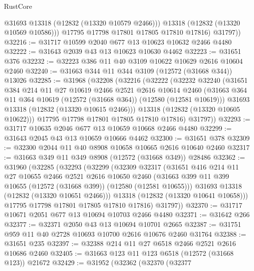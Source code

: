 \begin{lexlean}{RustCore}
\begin{coremodule}
              @31693
              @13318
              (@12832 (@13320 @10579 @2466)))
            @13318
            (@12832 (@13320 @10569 @10586)))
          @17795
          @17798
          @17801
          @17805
          @17810
          @17816)
        @31797))
@32216 := @31717 @10599 @2040 @677 @13 @10623 @10632 @2466 @4480
@32222 := @31643 @2039 @43 @13 @10623 @10630 @4462
@32223 := @31651 @376
@32232 := @32223 @386 @11 @40 @3109 @10622 @10629 @2616 @10604 @2460
@32240 := @31663 @344 @11 @344 @3109 (@12572 (@31668 @344)) @13026
@32285 := @31968
    (@32208
      (@32216
        (@32222
          (@32232
            @32240
            (@31651
              @384
              @214
              @11
              @27
              @10619
              @2466
              @2521
              @2616
              @10614
              @2460
              (@31663 @364 @11 @364 @10619 (@12572 (@31668 @364)) (@12580 (@12581 @10619)))
              @31693
              @13318
              (@12832 (@13320 @10615 @2466)))
            @13318
            (@12832 (@13320 @10605 @10622)))
          @17795
          @17798
          @17801
          @17805
          @17810
          @17816)
        @31797))
@32293 := @31717 @10635 @2046 @677 @13 @10659 @10668 @2466 @4480
@32299 := @31643 @2045 @43 @13 @10659 @10666 @4462
@32300 := @31651 @378
@32309 := @32300 @2044 @11 @40 @8908 @10658 @10665 @2616 @10640 @2460
@32317 := @31663 @349 @11 @349 @8908 (@12572 (@31668 @349)) @28486
@32362 := @31960
    (@32285
      (@32293
        (@32299
          (@32309
            @32317
            (@31651
              @416
              @214
              @11
              @27
              @10655
              @2466
              @2521
              @2616
              @10650
              @2460
              (@31663 @399 @11 @399 @10655 (@12572 (@31668 @399)) (@12580 (@12581 @10655)))
              @31693
              @13318
              (@12832 (@13320 @10651 @2466)))
            @13318
            (@12832 (@13320 @10641 @10658)))
          @17795
          @17798
          @17801
          @17805
          @17810
          @17816)
        @31797))
@32370 := @31717 @10671 @2051 @677 @13 @10694 @10703 @2466 @4480
@32371 := @31642 @266
@32377 := @32371 @2050 @43 @13 @10694 @10701 @2665
@32387 := @31751 @959 @11 @40 @2728 @10693 @10700 @2616 @10676 @2460 @31764
@32388 := @31651 @235
@32397 := @32388 @214 @11 @27 @6518 @2466 @2521 @2616 @10686 @2460
@32405 := @31663 @123 @11 @123 @6518 (@12572 (@31668 @123)) @21672
@32429 := @31952
    (@32362
      (@32370
        (@32377

\end{coremodule}
\end{lexlean}
